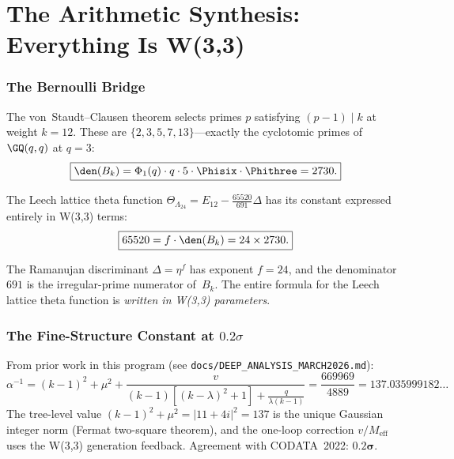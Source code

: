 \clearpage
\part{The Arithmetic Synthesis: Everything Is W(3,3)}

\section{The Bernoulli Bridge}

The von~Staudt--Clausen theorem selects primes $p$ satisfying $(p{-}1)\mid k$
at weight $k=12$. These are $\{2, 3, 5, 7, 13\}$---exactly the
cyclotomic primes of $\GQ(q,q)$ at $q=3$:
\begin{equation}
\boxed{\den(B_k) = \Phi_1(q)\cdot q\cdot 5\cdot\Phisix\cdot\Phithree = 2730.}
\end{equation}

\begin{theorem}
\label{thm:leech-theta}
The Leech lattice theta function
$\Theta_{\Lambda_{24}} = E_{12} - \frac{65520}{691}\Delta$
has its constant expressed entirely in W(3,3) terms:
\begin{equation}
\boxed{65520 = f\cdot\den(B_k) = 24\times 2730.}
\end{equation}
\end{theorem}

The Ramanujan discriminant $\Delta = \eta^f$ has exponent $f=24$,
and the denominator $691$ is the irregular-prime numerator of~$B_k$.
The entire formula for the Leech lattice theta function is
\emph{written in W(3,3) parameters}.


\section{\texorpdfstring{The Fine-Structure Constant at $0.2\sigma$}{The Fine-Structure Constant at 0.2 sigma}}

From prior work in this program (see \texttt{docs/DEEP\_ANALYSIS\_MARCH2026.md}):
\begin{equation}
\alpha^{-1} = (k{-}1)^2 + \mu^2 + \frac{v}{(k{-}1)[(k{-}\lambda)^2{+}1] + \frac{q}{\lambda(k{-}1)}}
= \frac{669969}{4889} = 137.035999182\ldots
\end{equation}
The tree-level value $(k{-}1)^2+\mu^2 = |11{+}4i|^2 = 137$ is the
unique Gaussian integer norm (Fermat two-square theorem), and the
one-loop correction $v/M_{\mathrm{eff}}$ uses the W(3,3) generation
feedback. Agreement with CODATA~2022: $\mathbf{0.2\sigma}$.



